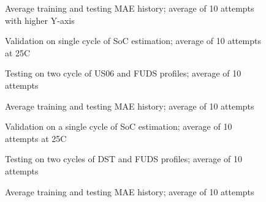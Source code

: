 \begin{figure*}[htbp]
    \centering
    \begin{subfigure}[b]{0.325\textwidth}
        \centering
        
        \caption{Average training and testing MAE history; average of 10 attempts with higher Y-axis}
    \end{subfigure}
    \hfill
    \begin{subfigure}[b]{0.325\textwidth}
        \centering
        
        \caption{Validation on single cycle of SoC estimation; average of 10 attempts at 25\textdegree{}C}
    \end{subfigure}
    \hfill
    \begin{subfigure}[b]{0.325\textwidth}
        \centering
        
        \caption{Testing on two cycle of US06 and FUDS profiles; average of 10 attempts}
        \label{subfig:Model-5res-DSTvsFUDS}
    \end{subfigure}
    \begin{subfigure}[b]{0.325\textwidth}
        \centering
        
        \caption{Average training and testing MAE history; average of 10 attempts}
    \end{subfigure}
    \hfill
    \begin{subfigure}[b]{0.325\textwidth}
        \centering
        
        \caption{Validation on a single cycle of SoC estimation; average of 10 attempts at 25\textdegree{}C}
    \end{subfigure}
    \hfill
    \begin{subfigure}[b]{0.325\textwidth}
        \centering
        
        \caption{Testing on two cycles of DST and FUDS profiles; average of 10 attempts}
    \end{subfigure}
    \begin{subfigure}[b]{0.325\textwidth}
        \centering
        
        \caption{Average training and testing MAE history; average of 10 attempts}

\end{subfigure}
\end{figure*}
